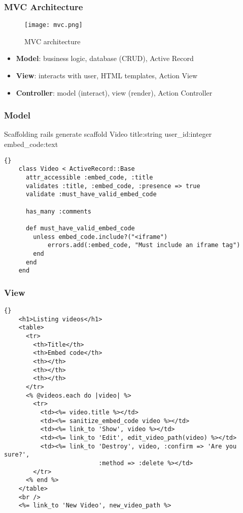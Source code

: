 \documentclass{beamer}
\begin{document}
\begin{frame}
  \frametitle{MVC Architecture}
  \begin{figure}
    \texttt{[image: mvc.png]}
    \caption{MVC architecture}
  \end{figure}
  \begin{itemize}
    \item \textbf{Model}: business logic, database (CRUD), Active Record
    \item \textbf{View}: interacts with user, HTML templates, Action View
    \item \textbf{Controller}: model (interact), view (render), Action Controller
  \end{itemize}
\end{frame}

\begin{frame}[fragile]
  \frametitle{Model}
  \begin{block}{Scaffolding}
    rails generate scaffold Video title:string user\_id:integer embed\_code:text
  \end{block}
  \begin{lstlisting}{}
    class Video < ActiveRecord::Base
      attr_accessible :embed_code, :title
      validates :title, :embed_code, :presence => true
      validate :must_have_valid_embed_code

      has_many :comments

      def must_have_valid_embed_code
  	    unless embed_code.include?("<iframe")
  		    errors.add(:embed_code, "Must include an iframe tag")
  	    end
      end
    end
  \end{lstlisting}
\end{frame}

\lstset{language=HTML}
\begin{frame}[fragile]
  \frametitle{View}
  \begin{lstlisting}{}
    <h1>Listing videos</h1>
    <table>
      <tr>
        <th>Title</th>
        <th>Embed code</th>
        <th></th>
        <th></th>
        <th></th>
      </tr>
      <% @videos.each do |video| %>
        <tr>
          <td><%= video.title %></td>
          <td><%= sanitize_embed_code video %></td>
          <td><%= link_to 'Show', video %></td>
          <td><%= link_to 'Edit', edit_video_path(video) %></td>
          <td><%= link_to 'Destroy', video, :confirm => 'Are you sure?',
                          :method => :delete %></td>
        </tr>
      <% end %>
    </table>
    <br />
    <%= link_to 'New Video', new_video_path %>
  \end{lstlisting}
\end{frame}
\end{document}
